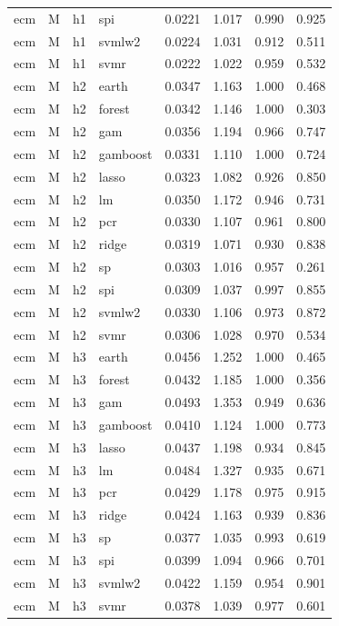 \begin{ThreePartTable}
\begin{longtable}[t]{llclcccc}
ecm & M & h1 & spi & 0.0221 & 1.017 & 0.990 & 0.925\\
ecm & M & h1 & svmlw2 & 0.0224 & 1.031 & 0.912 & 0.511\\
ecm & M & h1 & svmr & 0.0222 & 1.022 & 0.959 & 0.532\\
\addlinespace
ecm & M & h2 & earth & 0.0347 & 1.163 & 1.000 & 0.468\\
ecm & M & h2 & forest & 0.0342 & 1.146 & 1.000 & 0.303\\
ecm & M & h2 & gam & 0.0356 & 1.194 & 0.966 & 0.747\\
ecm & M & h2 & gamboost & 0.0331 & 1.110 & 1.000 & 0.724\\
ecm & M & h2 & lasso & 0.0323 & 1.082 & 0.926 & 0.850\\
ecm & M & h2 & lm & 0.0350 & 1.172 & 0.946 & 0.731\\
ecm & M & h2 & pcr & 0.0330 & 1.107 & 0.961 & 0.800\\
ecm & M & h2 & ridge & 0.0319 & 1.071 & 0.930 & 0.838\\
ecm & M & h2 & sp & 0.0303 & 1.016 & 0.957 & 0.261\\
ecm & M & h2 & spi & 0.0309 & 1.037 & 0.997 & 0.855\\
ecm & M & h2 & svmlw2 & 0.0330 & 1.106 & 0.973 & 0.872\\
ecm & M & h2 & svmr & 0.0306 & 1.028 & 0.970 & 0.534\\
\addlinespace
ecm & M & h3 & earth & 0.0456 & 1.252 & 1.000 & 0.465\\
ecm & M & h3 & forest & 0.0432 & 1.185 & 1.000 & 0.356\\
ecm & M & h3 & gam & 0.0493 & 1.353 & 0.949 & 0.636\\
ecm & M & h3 & gamboost & 0.0410 & 1.124 & 1.000 & 0.773\\
ecm & M & h3 & lasso & 0.0437 & 1.198 & 0.934 & 0.845\\
ecm & M & h3 & lm & 0.0484 & 1.327 & 0.935 & 0.671\\
ecm & M & h3 & pcr & 0.0429 & 1.178 & 0.975 & 0.915\\
ecm & M & h3 & ridge & 0.0424 & 1.163 & 0.939 & 0.836\\
ecm & M & h3 & sp & 0.0377 & 1.035 & 0.993 & 0.619\\
ecm & M & h3 & spi & 0.0399 & 1.094 & 0.966 & 0.701\\
ecm & M & h3 & svmlw2 & 0.0422 & 1.159 & 0.954 & 0.901\\
ecm & M & h3 & svmr & 0.0378 & 1.039 & 0.977 & 0.601\\

\end{longtable}
\end{ThreePartTable}
